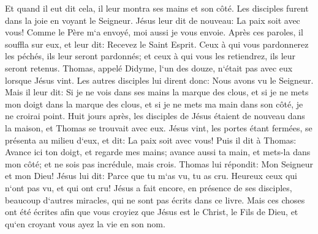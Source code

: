 \verse Et quand il eut dit cela, il leur montra ses mains et son côté. Les disciples furent dans la joie en voyant le Seigneur. 
\verse Jésus leur dit de nouveau: La paix soit avec vous! Comme le Père m`a envoyé, moi aussi je vous envoie. 
\verse Après ces paroles, il souffla sur eux, et leur dit: Recevez le Saint Esprit. 
\verse Ceux à qui vous pardonnerez les péchés, ils leur seront pardonnés; et ceux à qui vous les retiendrez, ils leur seront retenus. 
\verse Thomas, appelé Didyme, l`un des douze, n`était pas avec eux lorsque Jésus vint. 
\verse Les autres disciples lui dirent donc: Nous avons vu le Seigneur. Mais il leur dit: Si je ne vois dans ses mains la marque des clous, et si je ne mets mon doigt dans la marque des clous, et si je ne mets ma main dans son côté, je ne croirai point. 
\verse Huit jours après, les disciples de Jésus étaient de nouveau dans la maison, et Thomas se trouvait avec eux. Jésus vint, les portes étant fermées, se présenta au milieu d`eux, et dit: La paix soit avec vous! 
\verse Puis il dit à Thomas: Avance ici ton doigt, et regarde mes mains; avance aussi ta main, et mets-la dans mon côté; et ne sois pas incrédule, mais crois. 
\verse Thomas lui répondit: Mon Seigneur et mon Dieu! Jésus lui dit: 
\verse Parce que tu m`as vu, tu as cru. Heureux ceux qui n`ont pas vu, et qui ont cru! 
\verse Jésus a fait encore, en présence de ses disciples, beaucoup d`autres miracles, qui ne sont pas écrits dans ce livre. 
\verse Mais ces choses ont été écrites afin que vous croyiez que Jésus est le Christ, le Fils de Dieu, et qu`en croyant vous ayez la vie en son nom. 

\chapter{}

